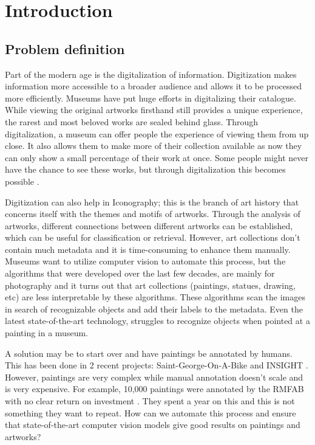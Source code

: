 \chapter{Introduction}
\label{chap:intro}

\section{Problem definition}

Part of the modern age is the digitalization of information.
Digitization makes information more accessible to a broader audience and allows it to be processed more efficiently.
Museums have put huge efforts in digitalizing their catalogue.
While viewing the original artworks firsthand still provides a unique experience, the rarest and most beloved works are sealed behind glass.
Through digitalization, a museum can offer people the experience of viewing them from up close.
It also allows them to make more of their collection available as now they can only show a small percentage of their work at once.
Some people might never have the chance to see these works, but through digitalization this becomes possible \cite{Digitization1}.

Digitization can also help in Iconography; this is the branch of art history that concerns itself with the themes and motifs of artworks.
Through the analysis of artworks, different connections between different artworks can be established, which can be useful for classification or retrieval.
However, art collections don't contain much metadata and it is time-consuming to enhance them manually.
Museums want to utilize computer vision to automate this process, but the algorithms that were developed over the last few decades, are mainly for photography and it turns out that art collections (paintings, statues, drawing, etc) are less interpretable by these algorithms.
These algorithms scan the images in search of recognizable objects and add their labels to the metadata.
Even the latest state-of-the-art technology, struggles to recognize objects when pointed at a painting in a museum.

A solution may be to start over and have paintings be annotated by humans.
This has been done in 2 recent projects: Saint-George-On-A-Bike \cite{GeorgeOnABike} and INSIGHT \cite{Insight}.
However, paintings are very complex while manual annotation doesn't scale and is very expensive.
For example, 10,000 paintings were annotated by the \gls{RMFAB} with no clear return on investment \cite{RMFAB2024}.
They spent a year on this and this is not something they want to repeat.
How can we automate this process and ensure that state-of-the-art computer vision models give good results on paintings and artworks?  

